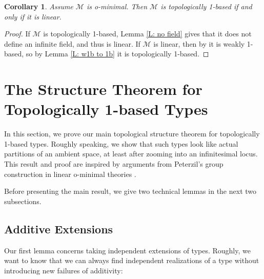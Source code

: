 \documentclass{amsart}
\newtheorem{corollary}[theorem]{Corollary}
\theoremstyle{definition}
\begin{document}
\begin{corollary}\label{C: omin}
    Assume $\mathcal M$ is o-minimal. Then $\mathcal M$ is topologically 1-based if and only if it is linear.
\end{corollary}
\begin{proof} If $\mathcal M$ is topologically 1-based, Lemma \ref{L: no field} gives that it does not define an infinite field, and thus is linear. If $\mathcal M$ is linear, then by \cite[\S 3.2, Theorem 2.20]{BerVas} it is weakly 1-based, so by Lemma \ref{L: w1b to 1b} it is topologically 1-based.
\end{proof}


\section{The Structure Theorem for Topologically 1-based Types}

In this section, we prove our main topological structure theorem for topologically 1-based types. Roughly speaking, we show that such types look like actual partitions of an ambient space, at least after zooming into an infinitesimal locus. This result and proof are inspired by arguments from Peterzil's group construction in linear o-minimal theories \cite{Pe}.

Before presenting the main result, we give two technical lemmas in the next two subsections.

\subsection{Additive Extensions}

Our first lemma concerns taking independent extensions of types. Roughly, we want to know that we can always find independent realizations of a type without introducing new failures of additivity:
\end{document}

